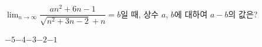 $\displaystyle\lim_{n\to\infty}\dfrac{an^2+6n-1}{\sqrt{n^2+3n-2}+n}=b$일 때, 상수 $a$, $b$에 대하여 $a-b$의 값은?
\begin{choices32}{$-5$}{$-4$}{$-3$}{$-2$}{$-1$}\end{choices32}
